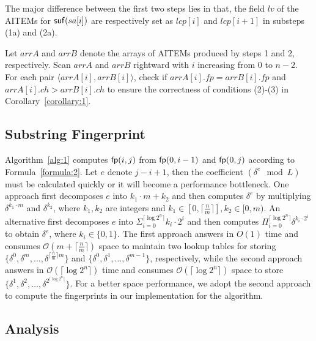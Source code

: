 \documentclass[10pt,journal,compsoc]{IEEEtran}
\begin{document}
	The major difference between the first two steps lies in that, the field $lv$ of the AITEMs for ${\sf suf}(sa[i])$ are respectively set as $lcp[i]$ and $lcp[i + 1]$ in substeps (1a) and (2a).
	
	
	\vspace{1ex}  Let $arrA$ and $arrB$ denote the arrays of AITEMs produced by steps 1 and 2, respectively. Scan $arrA$ and $arrB$ rightward with $i$ increasing from $0$ to $n - 2$. For each pair $\langle arrA[i], arrB[i]\rangle$, check if $arrA[i].fp = arrB[i].fp$ and $arrA[i].ch > arrB[i].ch$ to ensure the correctness of conditions (2)-(3) in Corollary~\ref{corollary:1}.
	
	\subsection{Substring Fingerprint} \label{sec:method1:fingerprint}
	
	Algorithm~\ref{alg:1} computes ${\sf fp}(i, j)$ from ${\sf fp}(0, i - 1)$ and ${\sf fp}(0, j)$ according to Formula~\ref{formula:2}. Let $e$ denote $j - i + 1$, then the coefficient $(\delta^{e} \mod L)$ must be calculated quickly or it will become a performance bottleneck. One approach first decomposes $e$ into $k_1 \cdot m + k_2$ and then computes $\delta^{e}$ by multiplying $\delta^{k_1 \cdot m}$ and $\delta^{k_2}$, where $k_1, k_2$ are integers and $k_1 \in [0, \lceil \frac{n}{m} \rceil], k_2 \in [0, m)$. An alternative first decomposes $e$ into $\Sigma_{i = 0}^{\lceil \log2^n \rceil}{k_i \cdot 2^i}$ and then computes $\Pi_{i = 0}^{\lceil \log2^n \rceil}{\delta}^{k_i \cdot 2^i}$ to obtain $\delta^{e}$, where $k_i \in \{0, 1\}$. The first approach answers in ${O}(1)$ time and consumes $\mathcal{O}(m + \lceil \frac{n}{m} \rceil )$ space to maintain two lookup tables for storing $\{{\delta}^{0}, {\delta}^{m}, \dots, {\delta}^{\lceil \frac{n}{m} \rceil m}\}$ and $\{{\delta}^{0}, {\delta}^{1},\dots,{\delta}^{m - 1} \}$, respectively, while the second approach answers in $\mathcal{O}(\lceil \log2^n \rceil)$ time and consumes $\mathcal{O}(\lceil \log2^n \rceil)$ space to store $\{{\delta}^{1}, {\delta}^{2}, \dots, {\delta}^{2^{\lceil \log2^n \rceil}} \}$. For a better space performance, we adopt the second approach to compute the fingerprints in our implementation for the algorithm.
	
	
	\subsection{Analysis} \label{sec:method1:analysis}
	
\end{document}
